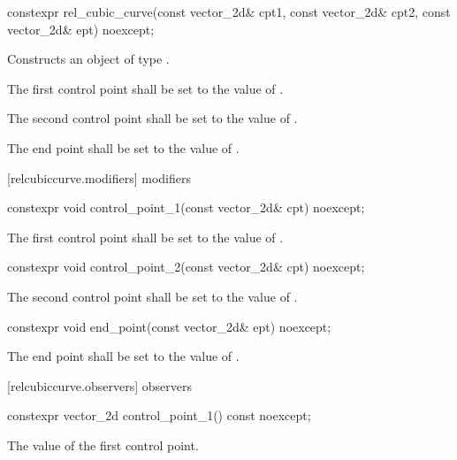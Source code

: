 \begin{itemdecl}
constexpr rel_cubic_curve(const vector_2d& cpt1, const vector_2d& cpt2,
  const vector_2d& ept) noexcept;
\end{itemdecl}
\begin{itemdescr}
\pnum
\effects
Constructs an object of type .

\pnum
The first control point shall be set to the value of .

\pnum
The second control point shall be set to the value of .

\pnum
The end point shall be set to the value of .
\end{itemdescr}

 [relcubiccurve.modifiers]{ modifiers}

\begin{itemdecl}
constexpr void control_point_1(const vector_2d& cpt) noexcept;
\end{itemdecl}
\begin{itemdescr}
\pnum
\effects
The first control point shall be set to the value of .
\end{itemdescr}

\begin{itemdecl}
constexpr void control_point_2(const vector_2d& cpt) noexcept;
\end{itemdecl}
\begin{itemdescr}
\pnum
\effects
The second control point shall be set to the value of .
\end{itemdescr}

\begin{itemdecl}
constexpr void end_point(const vector_2d& ept) noexcept;
\end{itemdecl}
\begin{itemdescr}
\pnum
\effects
The end point shall be set to the value of .
\end{itemdescr}

 [relcubiccurve.observers]{ observers}

\begin{itemdecl}
constexpr vector_2d control_point_1() const noexcept;
\end{itemdecl}
\begin{itemdescr}
\pnum
\returns
The value of the first control point.
\end{itemdescr}

